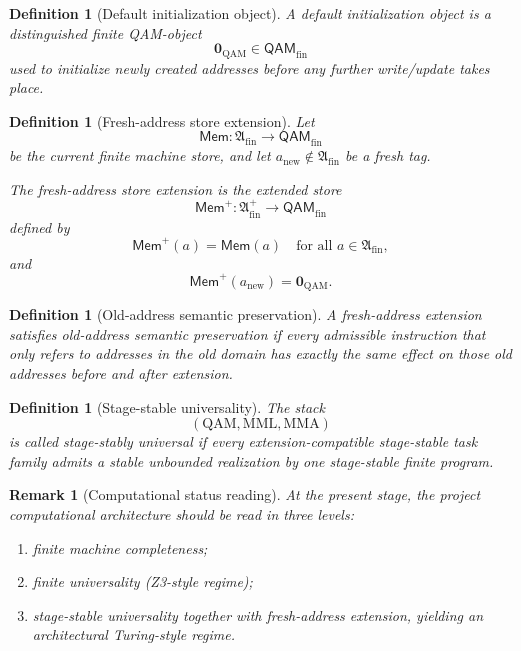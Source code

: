 \documentclass[12pt,a4paper]{article}
\newtheorem{definition}[theorem]{Definition}
\newtheorem{remark}[theorem]{Remark}
\begin{document}
\begin{definition}[Default initialization object]\label{def:default-initialization-object-computational-layer}
A \emph{default initialization object} is a distinguished finite QAM-object
\[
\mathbf{0}_{\mathrm{QAM}}\in\mathsf{QAM}_{\mathrm{fin}}
\]
used to initialize newly created addresses before any further write/update takes place.
\end{definition}

\begin{definition}[Fresh-address store extension]\label{def:fresh-address-store-extension-computational-layer}
Let
\[
\mathsf{Mem}:\mathfrak{A}_{\mathrm{fin}}\to\mathsf{QAM}_{\mathrm{fin}}
\]
be the current finite machine store, and let \(a_{\mathrm{new}}\notin\mathfrak{A}_{\mathrm{fin}}\) be a fresh tag.

The \emph{fresh-address store extension} is the extended store
\[
\mathsf{Mem}^{+}:\mathfrak{A}_{\mathrm{fin}}^{+}\to\mathsf{QAM}_{\mathrm{fin}}
\]
defined by
\[
\mathsf{Mem}^{+}(a)=\mathsf{Mem}(a)
\quad
\text{for all } a\in\mathfrak{A}_{\mathrm{fin}},
\]
and
\[
\mathsf{Mem}^{+}(a_{\mathrm{new}})=\mathbf{0}_{\mathrm{QAM}}.
\]
\end{definition}

\begin{definition}[Old-address semantic preservation]\label{def:old-address-semantic-preservation-computational-layer}
A fresh-address extension satisfies \emph{old-address semantic preservation} if every admissible instruction that only refers to addresses in the old domain has exactly the same effect on those old addresses before and after extension.
\end{definition}

\begin{definition}[Stage-stable universality]\label{def:stage-stable-universality-computational-layer}
The stack
\[
(\mathrm{QAM},\mathrm{MML},\mathrm{MMA})
\]
is called \emph{stage-stably universal} if every extension-compatible stage-stable task family admits a stable unbounded realization by one stage-stable finite program.
\end{definition}

\begin{remark}[Computational status reading]\label{rem:computational-status-reading-computational-layer}
At the present stage, the project computational architecture should be read in three levels:
\begin{enumerate}[leftmargin=2em]
 \item finite machine completeness;
 \item finite universality (Z3-style regime);
 \item stage-stable universality together with fresh-address extension, yielding an architectural Turing-style regime.
\end{enumerate}
\end{remark}
\end{document}
